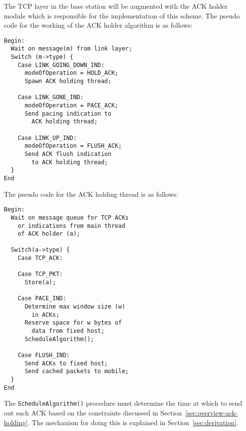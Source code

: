 \documentclass[conference]{IEEEtran}
\begin{document}
The TCP layer in the base station will be augmented with the ACK holder module which is responsible for the implementation of this scheme. The pseudo code for the working of the ACK holder algorithm is as follows:

\begin{verbatim}
Begin:
  Wait on message(m) from link layer;
  Switch (m->type) {
    Case LINK_GOING_DOWN_IND:
      modeOfOperation = HOLD_ACK;
      Spawn ACK holding thread;
    
    Case LINK_GONE_IND:
      modeOfOperation = PACE_ACK;
      Send pacing indication to 
        ACK holding thread;
		
    Case LINK_UP_IND:
      modeOfOperation = FLUSH_ACK;
      Send ACK flush indication 
        to ACK holding thread;
  }
End
\end{verbatim}
The pseudo code for the ACK holding thread is as follows:
\begin{verbatim}
Begin:
  Wait on message queue for TCP ACKs
    or indications from main thread 
    of ACK holder (a);

  Switch(a->type) {
    Case TCP_ACK:

    Case TCP_PKT:
      Store(a);
		
    Case PACE_IND:
      Determine max window size (w) 
        in ACKs; 
      Reserve space for w bytes of 
        data from fixed host;
      ScheduleAlgorithm();
		
    Case FLUSH_IND:
      Send ACKs to fixed host;
      Send cached packets to mobile;
  }
End
\end{verbatim}
The \texttt{ScheduleAlgorithm()} procedure must determine the time at which to send out each ACK based on the constraints discussed in Section~\ref{sec:overview-ack-holding}. The mechanism for doing this is explained in Section~\ref{sec:derivation}.
\end{document}
